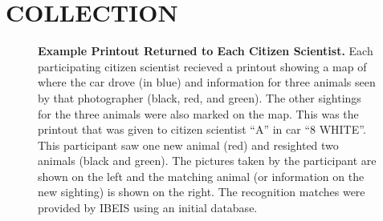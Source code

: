 
\chapter{COLLECTION} \label{sec:collection}

\begin{figure}[t]%
    \centering
    \caption[Example Printout Returned to Each Citizen Scientist]{\textbf{Example Printout Returned to Each Citizen Scientist.}  Each participating citizen scientist recieved a printout showing a map of where the car drove (in blue) and information for three animals seen by that photographer (black, red, and green).  The other sightings for the three animals were also marked on the map.  This was the printout that was given to citizen scientist ``A'' in car ``8 WHITE''.  This participant saw one new animal (red) and resighted two animals (black and green).  The pictures taken by the participant are shown on the left and the matching animal (or information on the new sighting) is shown on the right.  The recognition matches were provided by IBEIS using an initial database.}
        \label{fig:printout}
\end{figure}

